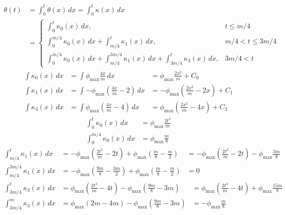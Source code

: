 \documentclass{article}
\begin{document}
\begin{align}
  \theta\left(t\right) &= \int_0^t \dot{\theta}\left(x\right)\,dx = \int_0^t \kappa\left(x\right)\,dx\\
  &= \left\{
    \begin{array}{cc}
      \int_0^t \kappa_{0}\left(x\right)\,dx,   & t \le m/4\\
      \int_0^{m/4} \kappa_{0}\left(x\right)\,dx + \int_{m/4}^t     \kappa_{1}\left(x\right)\,dx,   & m/4 < t \le 3m/4\\
      \int_0^{m/4} \kappa_{0}\left(x\right)\,dx + \int_{m/4}^{3m/4} \kappa_{1}\left(x\right)\,dx + \int_{3m/4}^t \kappa_{3}\left(x\right)\,dx, & 3m/4 < t
    \end{array}
  \right.
\end{align}
\begin{align}
  \int \kappa_{0}\left(x\right)\,dx &= \int \phi_{\max}\frac{4x}{m}\,dx &= \phi_{\max}\frac{2x^{2}}{m} + C_{0}\\
  \int \kappa_{1}\left(x\right)\,dx &= \int -\phi_{\max}\left(\frac{4x}{m}-2\right)\,dx &= -\phi_{\max}\left(\frac{2x^{2}}{m}-2x\right) + C_{1}\\
  \int \kappa_{3}\left(x\right)\,dx &= \int \phi_{\max}\left(\frac{4x}{m}-4\right)\,dx &= \phi_{\max}\left(\frac{2x^{2}}{m}-4x\right) + C_{3}
\end{align}
\begin{align}
  \int_{0}^{t} \kappa_{0}\left(x\right)\,dx &= \phi_{\max}\frac{2t^{2}}{m}\\
  \int_{0}^{m/4} \kappa_{0}\left(x\right)\,dx &= \phi_{\max}\frac{m}{8}
\end{align}
\begin{align}
  \int_{m/4}^{t} \kappa_{1}\left(x\right)\,dx &= -\phi_{\max}\left(\frac{2t^{2}}{m}-2t\right) + \phi_{\max}\left(\frac{m}{8}-\frac{m}{2}\right) &= -\phi_{\max}\left(\frac{2t^{2}}{m}-2t\right) - \phi_{\max}\frac{3m}{8}\\
  \int_{m/4}^{3m/4} \kappa_{1}\left(x\right)\,dx &= -\phi_{\max}\left(\frac{9m}{8}-\frac{3m}{2}\right) + \phi_{\max}\left(\frac{m}{8}-\frac{m}{2}\right) &= 0
\end{align}
\begin{align}
  \int_{3m/4}^{t} \kappa_{3}\left(x\right)\,dx &= \phi_{\max}\left(\frac{2t^{2}}{m}-4t\right) - \phi_{\max}\left(\frac{9m}{8}-3m\right) &= \phi_{\max}\left(\frac{2t^{2}}{m}-4t\right) + \phi_{\max}\frac{15m}{8}\\
  \int_{3m/4}^{m} \kappa_{3}\left(x\right)\,dx &= \phi_{\max}\left(2m-4m\right) - \phi_{\max}\left(\frac{9m}{8}-3m\right) &= -\phi_{\max}\frac{m}{8}
\end{align}
\end{document}
